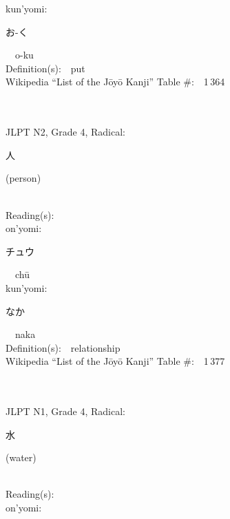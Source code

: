 \begin{multicols}{2}
{\hspace*{1em}}kun'yomi:\ \ \\
{\hspace*{2em}}{\begin{CJK}{UTF8}{min} お-く \end{CJK}}\ \ o-ku\ \ \\
Definition(s):\ \ put \\
Wikipedia ``List of the J\=oy\=o Kanji'' Table \#:\ \ 1\,364 \\
\ \ \\
{\fontsize{34pt}{40pt}  }\ \ \\  %
{JLPT N2, Grade 4, Radical:\ \ {\begin{CJK}{UTF8}{min} 人 \end{CJK}} (person) } \\
Reading(s):\ \ \\
{\hspace*{1em}}on'yomi:\ \ \\
{\hspace*{2em}}{\begin{CJK}{UTF8}{min} チュウ \end{CJK}}\ \ ch\=u\ \ \\
{\hspace*{1em}}kun'yomi:\ \ \\
{\hspace*{2em}}{\begin{CJK}{UTF8}{min} なか \end{CJK}}\ \ naka\ \ \\
Definition(s):\ \ relationship \\
Wikipedia ``List of the J\=oy\=o Kanji'' Table \#:\ \ 1\,377 \\
\ \ \\
{\fontsize{34pt}{40pt}  }\ \ \\  %
{JLPT N1, Grade 4, Radical:\ \ {\begin{CJK}{UTF8}{min} 水 \end{CJK}} (water) } \\
Reading(s):\ \ \\
{\hspace*{1em}}on'yomi:\ \ \\

\end{multicols}

